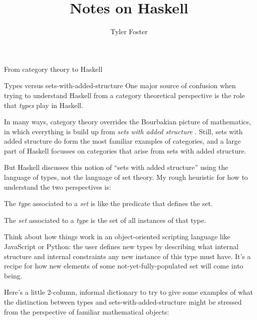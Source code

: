 \documentclass[11pt, a4paper]{article}
\begin{document}
\title{Notes on Haskell}

\author{Tyler Foster}

\maketitle

\tableofcontents

\begin{section}{From category theory to Haskell}

\begin{subsection}{Types versus sets-with-added-structure}
One major source of confusion when trying to understand Haskell from a category theoretical perspective is the role that {\em types} play in Haskell.

In many ways, category theory overrides the Bourbakian picture of mathematics, in which everything is build up from {\em sets with added structure} \cite{ToolObject} \cite{Geometric}. Still, sets with added structure do form the most familiar examples of categories, and a large part of Haskell focusses on categories that arise from sets with added structure.

But Haskell discusses this notion of ``sets with added structure'' using the language of types, not the language of set theory. My rough heuristic for how to understand the two perspectives is:
\begin{center}
The {\em type} associated to a {\em set} is like the predicate that defines the set.
\end{center}
\begin{center}
The {\em set} associated to a {\em type} is the set of all instances of that type.
\end{center}

\noindent
Think about how things work in an object-oriented scripting language like JavaScript or Python: the user defines new types by describing what internal structure and internal constraints any new instance of this type must have. It's a recipe for how new elements of some not-yet-fully-populated set will come into being.

Here's a little 2-column, informal dictionary to try to give some examples of what the distinction between types and sets-with-added-structure might be stressed from the perspective of familiar mathematical objects:

\begin{center}


\end{center}
\end{subsection}
\end{section}
\end{document}
